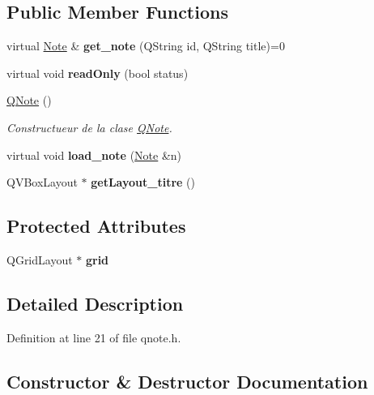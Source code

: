 \subsection*{Public Member Functions}
\begin{DoxyCompactItemize}
\item 
\mbox{\label{class_q_note_a9938dcbd69ea0f0cbc12a8faa2a38576}} 
virtual \hyperlink{class_note}{Note} \& {\bfseries get\+\_\+note} (Q\+String id, Q\+String title)=0
\item 
\mbox{\label{class_q_note_ae6fb14b839acc1979b145a892d6a0a92}} 
virtual void {\bfseries read\+Only} (bool status)
\item 
\hyperlink{class_q_note_a4f3980466d58be3cb5e15d2e45d74840}{Q\+Note} ()
\begin{DoxyCompactList}\small\item\em Constructueur de la clase \hyperlink{class_q_note}{Q\+Note}. \end{DoxyCompactList}\item 
\mbox{\label{class_q_note_adca0a8f2851fbb1c3843ca4fe7957c11}} 
virtual void {\bfseries load\+\_\+note} (\hyperlink{class_note}{Note} \&n)
\item 
\mbox{\label{class_q_note_aa7e7772b41fe2443cf1225bf1937a4ca}} 
Q\+V\+Box\+Layout $\ast$ {\bfseries get\+Layout\+\_\+titre} ()
\end{DoxyCompactItemize}
\subsection*{Protected Attributes}
\begin{DoxyCompactItemize}
\item 
\mbox{\label{class_q_note_a126c0984d4769bd7a565e1303eac3184}} 
Q\+Grid\+Layout $\ast$ {\bfseries grid}
\end{DoxyCompactItemize}


\subsection{Detailed Description}


Definition at line 21 of file qnote.\+h.



\subsection{Constructor \& Destructor Documentation}
\mbox{\label{class_q_note_a4f3980466d58be3cb5e15d2e45d74840}} 
